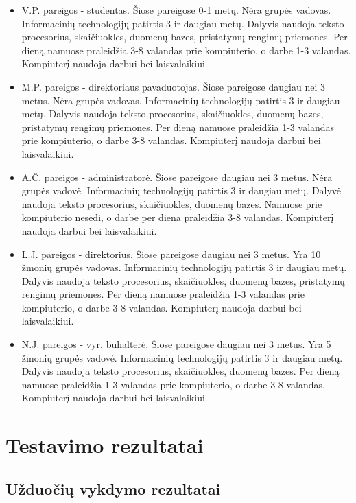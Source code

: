 		\begin{itemize}
			\item V.P. pareigos - studentas. Šiose pareigose 0-1 metų. Nėra grupės vadovas. Informacinių technologijų patirtis 3 ir daugiau metų.
			Dalyvis naudoja teksto procesorius, skaičiuokles, duomenų bazes, pristatymų rengimų priemones.
			Per dieną namuose praleidžia 3-8 valandas prie kompiuterio, o darbe 1-3 valandas.
			Kompiuterį naudoja darbui bei laisvalaikiui.
			\item M.P. pareigos - direktoriaus pavaduotojas. Šiose pareigose daugiau nei 3 metus. Nėra grupės vadovas. Informacinių technologijų patirtis 3 ir daugiau metų.
			Dalyvis naudoja teksto procesorius, skaičiuokles, duomenų bazes, pristatymų rengimų priemones.
			Per dieną namuose praleidžia 1-3 valandas prie kompiuterio, o darbe 3-8 valandas.
			Kompiuterį naudoja darbui bei laisvalaikiui.
			\item A.Č. pareigos - administratorė. Šiose pareigose daugiau nei 3 metus. Nėra grupės vadovė. Informacinių technologijų patirtis 3 ir daugiau metų.
			Dalyvė naudoja teksto procesorius, skaičiuokles, duomenų bazes.
			Namuose prie kompiuterio nesėdi, o darbe per diena praleidžia 3-8 valandas.
			Kompiuterį naudoja darbui bei laisvalaikiui.
			\item L.J. pareigos - direktorius. Šiose pareigose daugiau nei 3 metus. Yra 10 žmonių grupės vadovas. Informacinių technologijų patirtis 3 ir daugiau metų.
			Dalyvis naudoja teksto procesorius, skaičiuokles, duomenų bazes, pristatymų rengimų priemones.
			Per dieną namuose praleidžia 1-3 valandas prie kompiuterio, o darbe 3-8 valandas.
			Kompiuterį naudoja darbui bei laisvalaikiui.
			\item N.J. pareigos - vyr. buhalterė. Šiose pareigose daugiau nei 3 metus. Yra 5 žmonių grupės vadovė. Informacinių technologijų patirtis 3 ir daugiau metų.
			Dalyvis naudoja teksto procesorius, skaičiuokles, duomenų bazes.
			Per dieną namuose praleidžia 1-3 valandas prie kompiuterio, o darbe 3-8 valandas.
			Kompiuterį naudoja darbui bei laisvalaikiui.
		\end{itemize}
	

\section{Testavimo rezultatai}

	\subsection{Užduočių vykdymo rezultatai}
	
